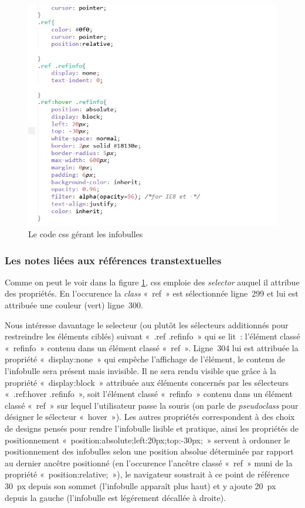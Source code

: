 \documentclass[12pt, a4paper]{article}
\begin{document}
\begin{figure}[H]
    \centering
    \includegraphics[scale=0.8]{img/screen_css_infobulle.jpg}
    \caption{Le code css gérant les infobulles}
    \label{screenCssInfo}
\end{figure}

\subsubsection{Les notes liées aux références transtextuelles}

Comme on peut le voir dans la figure \ref{screenCssInfo}, css emploie des \textit{selector} auquel il attribue des propriétés. En l'occurence la \textit{class} «~ref~» est sélectionnée ligne~299 et lui est attribuée une couleur (vert) ligne~300.

Nous intéresse davantage le selecteur (ou plutôt les sélecteurs additionnés pour restreindre les éléments ciblés) suivant «~.ref .refinfo~» qui se lit~: l'élément classé «~refinfo~» contenu dans un élément classé «~ref~». Ligne~304 lui est attribuée la propriété «~display:none~» qui empêche l'affichage de l'élément, le contenu de l'infobulle sera présent mais invisible. Il ne sera rendu visible que grâce à la propriété «~display:block~» attribuée aux éléments concernés par les sélecteurs «~.ref:hover .refinfo~», soit l'élément classé «~refinfo~» contenu dans un élément classé «~ref~» sur lequel l'utilisateur passe la souris (on parle de \textit{pseudoclass} pour désigner le sélecteur «~hover~»). Les autres propriétés correspondent à des choix de designs pensés pour rendre l'infobulle lisible et pratique, ainsi les propriétés de positionnement «~position:absolute;left:20px;top:-30px;~» servent à ordonner le positionnement des infobulles selon une position absolue déterminée par rapport au dernier ancêtre positionné (en l'occurence l'ancêtre classé «~ref~» muni de la propriété «~position:relative;~»), le navigateur soustrait à ce point de référence 30~px depuis son sommet (l'infobulle apparaît plus haut) et y ajoute 20~px depuis la gauche (l'infobulle est légérement décallée à droite).
\end{document}

